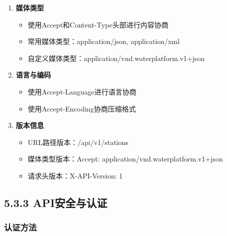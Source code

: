 \begin{enumerate}
\def\labelenumi{\arabic{enumi}.}
\tightlist
\item
  \textbf{媒体类型}

  \begin{itemize}
  \tightlist
  \item
    使用Accept和Content-Type头部进行内容协商
  \item
    常用媒体类型：application/json, application/xml
  \item
    自定义媒体类型：application/vnd.waterplatform.v1+json
  \end{itemize}
\item
  \textbf{语言与编码}

  \begin{itemize}
  \tightlist
  \item
    使用Accept-Language进行语言协商
  \item
    使用Accept-Encoding协商压缩格式
  \end{itemize}
\item
  \textbf{版本信息}

  \begin{itemize}
  \tightlist
  \item
    URL路径版本：/api/v1/stations
  \item
    媒体类型版本：Accept: application/vnd.waterplatform.v1+json
  \item
    请求头版本：X-API-Version: 1
  \end{itemize}
\end{enumerate}

\subsection{5.3.3
API安全与认证}\label{apiux5b89ux5168ux4e0eux8ba4ux8bc1}

\subsubsection{认证方法}\label{ux8ba4ux8bc1ux65b9ux6cd5}

